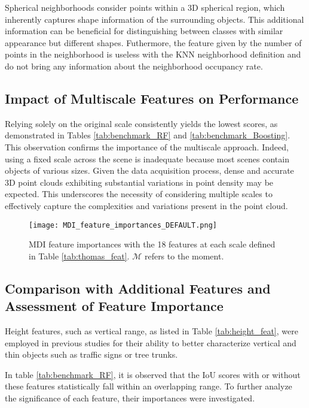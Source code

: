 \documentclass{article}
\begin{document}
Spherical neighborhoods consider points within a 3D spherical region, which inherently captures shape information of the surrounding objects. This additional information can be beneficial for distinguishing between classes with similar appearance but different shapes. Futhermore, the feature given by the number of points in the neighborhood is useless with the KNN neighborhood definition and do not bring any information about the neighborhood occupancy rate. 

\subsection{Impact of Multiscale Features on Performance}\label{sec:w/o_multiscale}
Relying solely on the original scale consistently yields the lowest scores, as demonstrated in Tables \ref{tab:benchmark_RF} and \ref{tab:benchmark_Boosting}. This observation confirms the importance of the multiscale approach. Indeed, using a fixed scale across the scene is inadequate because most scenes contain objects of various sizes. Given the data acquisition process, dense and accurate 3D point clouds exhibiting substantial variations in point density may be expected. This underscores the necessity of considering multiple scales to effectively capture the complexities and variations present in the point cloud.

\begin{figure}[H]
    \hspace*{-2cm}  
        \texttt{[image: MDI\_feature\_importances\_DEFAULT.png]}
        \caption{MDI feature importances with the 18 features at each scale defined in Table \ref{tab:thomas_feat}. $\mathcal{M}$ refers to the moment.}
        \label{fig:MDI_default}
\end{figure}

\subsection{Comparison with Additional Features and Assessment of Feature Importance}\label{sec:compare_w/o_height}


Height features, such as vertical range, as listed in Table \ref{tab:height_feat}, were employed in previous studies \cite{hackel_fast_nodate,mohamed_improvement_2022} for their ability to better characterize vertical and thin objects such as traffic signs or tree trunks. 

In table \ref{tab:benchmark_RF}, it is observed that the IoU scores with or without these features statistically fall within an overlapping range. To further analyze the significance of each feature, their importances were investigated. 
\end{document}
